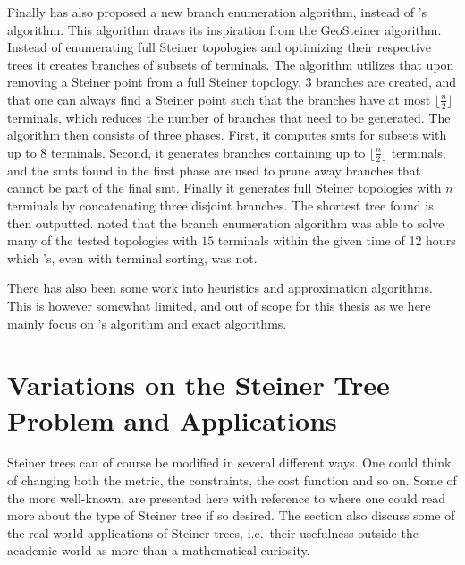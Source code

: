 Finally \textcite{fonseca2014} has also proposed a new branch enumeration
algorithm, instead of \citeauthor{smith1992}'s algorithm. This algorithm draws
its inspiration from the GeoSteiner algorithm. Instead of enumerating full Steiner
topologies and optimizing their respective trees it creates branches of subsets
of terminals. The algorithm utilizes that upon removing a Steiner point from a
full Steiner topology, $3$ branches are created, and that one can always find a
Steiner point such that the branches have at most $\lfloor \frac{n}{2} \rfloor$
terminals, which reduces the number of branches that need to be generated. The
algorithm then consists of three phases. First, it computes \acp{smt} for subsets
with up to $8$ terminals. Second, it generates branches containing up to
$\lfloor \frac{n}{2} \rfloor$ terminals, and the \acp{smt} found in the first
phase are used to prune away branches that cannot be part of the final
\ac{smt}. Finally it generates full Steiner topologies with $n$ terminals by
concatenating three disjoint branches. The shortest tree found is then
outputted. \citeauthor{fonseca2014} noted that the branch enumeration algorithm
was able to solve many of the tested topologies with $15$ terminals within the
given time of 12 hours which \citeauthor{smith1992}'s, even with terminal
sorting, was not.

There has also been some work into heuristics and approximation algorithms. This
is however somewhat limited, and out of scope for this thesis as we here mainly
focus on \citeauthor{smith1992}'s algorithm and exact algorithms.

\section{Variations on the Steiner Tree Problem and Applications}
\label{sec:vari-stein-tree}

Steiner trees can of course be modified in several different ways. One could
think of changing both the metric, the constraints, the cost function and so
on. Some of the more well-known, are presented here with reference to where one
could read more about the type of Steiner tree if so desired. The section also
discuss some of the real world applications of Steiner trees, i.e.\ their
usefulness outside the academic world as more than a mathematical curiosity.


